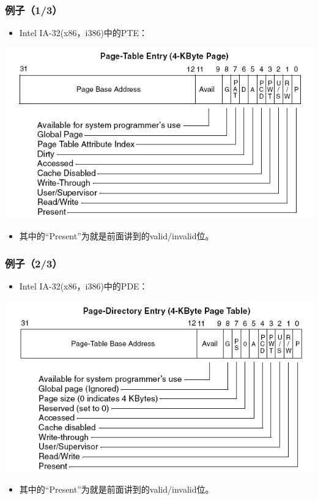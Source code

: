 \documentclass[CJKutf8,xcolor=pdftex,dvipsnames,table]{beamer}
\begin{document}
\begin{CJK*}{UTF8}{song}
  \begin{frame}
  \frametitle{例子（1/3）} \pause
  \begin{itemize}
  \item{Intel IA-32(x86，i386)中的PTE：} \pause
  \end{itemize}
  \begin{center}
    \includegraphics[scale=.5]{x86pte} \pause
  \end{center}
  \begin{itemize}
  \item{其中的“Present”为就是前面讲到的valid/invalid位。}
  \end{itemize}
  \end{frame}
  
  \begin{frame}
  \frametitle{例子（2/3）} \pause
  \begin{itemize}
  \item{Intel IA-32(x86，i386)中的PDE：} \pause
  \end{itemize}
  \begin{center}
    \includegraphics[scale=.5]{x86pde} \pause
  \end{center}
  \begin{itemize}
  \item{其中的“Present”为就是前面讲到的valid/invalid位。}
  \end{itemize}
  \end{frame}
  

\end{CJK*}
\end{document}
